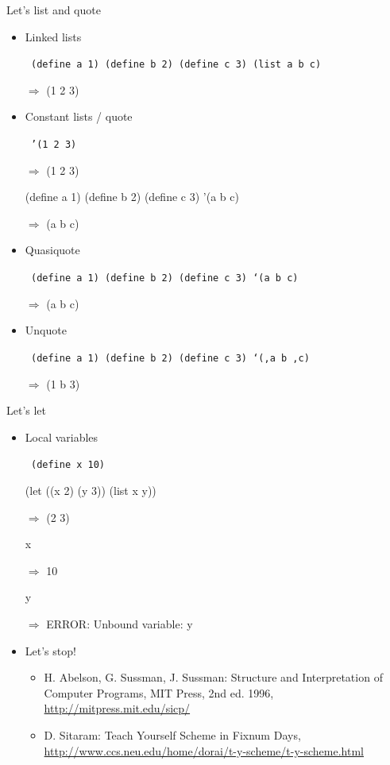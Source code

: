 \documentclass [t]{beamer}
\begin{document}
\begin {frame}{Let's list and quote}
\begin {itemize}
\item
\textcolor {blau}{Linked lists}

{
\tt
(define a 1) (define b 2) (define c 3)
(\textcolor {rot}{list} a b c)

$\Rightarrow$ (1 2 3)
}
\item
Constant lists / \textcolor {blau}{quote}

{
\tt
'(1 2 3)

$\Rightarrow$ (1 2 3)

(define a 1) (define b 2) (define c 3)
\textcolor {rot}{'}(a b c)

$\Rightarrow$ (a b c)
}
\item \textcolor {blau}{Quasiquote}

{
\tt
(define a 1) (define b 2) (define c 3)
\textcolor {rot}{`}(a b c)

$\Rightarrow$ (a b c)
}
\item \textcolor {blau}{Unquote}

{
\tt
(define a 1) (define b 2) (define c 3)
`(\textcolor {rot}{,}a b \textcolor {rot}{,}c)

$\Rightarrow$ (1 b 3)
}
\end {itemize}
\end {frame}


\begin {frame}{Let's let}
\begin {itemize}
\item
\textcolor {blau}{Local variables}

{
\tt
(define x 10)

(\textcolor {rot}{let} ((x 2) (y 3)) (list x y))

$\Rightarrow$ (2 3)

x

$\Rightarrow$ 10

y

$\Rightarrow$ ERROR: Unbound variable: y
}
\item
\textcolor {rot}{Let's stop!}
\begin {itemize}
\item
H. Abelson, G. Sussman, J. Sussman: \textcolor {blau}{Structure and Interpretation
of Computer Programs}, MIT Press, 2nd ed. 1996,
\url {http://mitpress.mit.edu/sicp/}
\item
D. Sitaram: \textcolor {blau}{Teach Yourself Scheme in Fixnum Days},
\url {http://www.ccs.neu.edu/home/dorai/t-y-scheme/t-y-scheme.html}
\end {itemize}
\end {itemize}
\end {frame}
\end{document}
